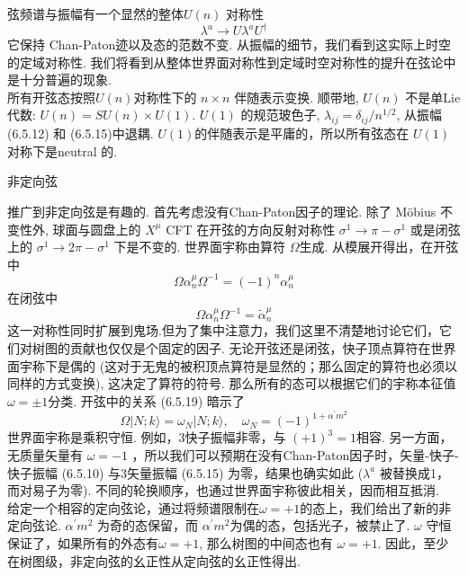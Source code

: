 弦频谱与振幅有一个显然的整体$U(n)$ 对称性
\begin{equation}
	\lambda^{a} \rightarrow U \lambda^{a} U^{\dagger}
\end{equation}
它保持 Chan-Paton迹以及态的范数不变. 从振幅的细节，我们看到这实际上时空的定域对称性. 我们将看到从整体世界面对称性到定域时空对称性的提升在弦论中是十分普遍的现象.\\
所有开弦态按照$U(n)$对称性下的 $n \times n$ 伴随表示变换. 顺带地, $U(n)$ 不是单Lie 代数: $U(n)=S U(n) \times U(1) $. $U(1)$ 的规范玻色子, $\lambda_{i j}=\delta_{i j} / n^{1 / 2}$, 从振幅 (6.5.12) 和 (6.5.15)中退耦.  $U(1)$的伴随表示是平庸的，所以所有弦态在 $U(1)$ 对称下是neutral 的.\\

\centerline{\Large 非定向弦}
推广到非定向弦是有趣的. 首先考虑没有Chan-Paton因子的理论. 除了 Möbius 不变性外, 球面与圆盘上的 $X^{\mu}$ CFT 在开弦的方向反射对称性 $\sigma^{1} \rightarrow \pi-\sigma^{1}$ 或是闭弦上的 $\sigma^{1} \rightarrow 2 \pi-\sigma^{1}$ 下是不变的. 世界面宇称由算符 $\Omega$生成. 从模展开得出，在开弦中
\begin{equation}
	\Omega \alpha_{n}^{\mu} \Omega^{-1}=(-1)^{n} \alpha_{n}^{\mu}
\end{equation}
在闭弦中
\begin{equation}
	\Omega \alpha_{n}^{\mu} \Omega^{-1}=\tilde{\alpha}_{n}^{\mu}
\end{equation}
这一对称性同时扩展到鬼场.但为了集中注意力，我们这里不清楚地讨论它们，它们对树图的贡献也仅仅是个固定的因子. 无论开弦还是闭弦，快子顶点算符在世界面宇称下是偶的 (这对于无鬼的被积顶点算符是显然的；那么固定的算符也必须以同样的方式变换), 这决定了算符的符号. 那么所有的态可以根据它们的宇称本征值 $\omega=\pm 1 $分类.  开弦中的关系 (6.5.19) 暗示了
\begin{equation}
	\Omega|N ; k\rangle=\omega_{N}|N ; k\rangle, \quad \omega_{N}=(-1)^{1+\alpha^{\prime} m^{2}}
\end{equation}
世界面宇称是乘积守恒. 例如，3快子振幅非零，与 $(+1)^{3}=1 $相容.  另一方面，无质量矢量有 $\omega=-1$ ，所以我们可以预期在没有Chan-Paton因子时，矢量-快子-快子振幅 (6.5.10) 与3矢量振幅 (6.5.15) 为零，结果也确实如此 ($\lambda^{a}$ 被替换成1，而对易子为零). 不同的轮换顺序，也通过世界面宇称彼此相关，因而相互抵消.\\
给定一个相容的定向弦论，通过将频谱限制在$\omega=+1$的态上，我们给出了新的非定向弦论.  $\alpha^{\prime} m^{2}$ 为奇的态保留，而 $\alpha^{\prime} m^{2}$为偶的态，包括光子，被禁止了. $\omega$ 守恒保证了，如果所有的外态有$\omega=+1$, 那么树图的中间态也有 $\omega=+1$. 因此，至少在树图级，非定向弦的幺正性从定向弦的幺正性得出. \\
